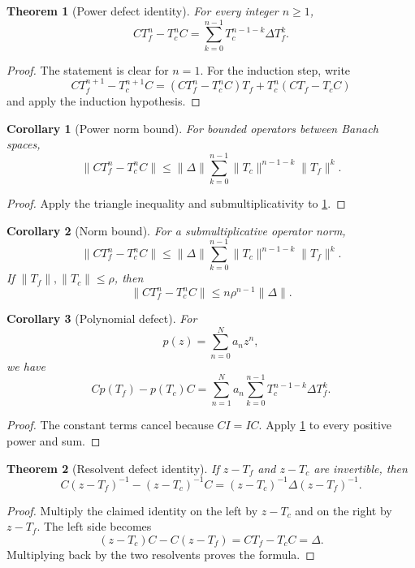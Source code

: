 \documentclass[11pt,a4paper]{article}
\newtheorem{theorem}{Theorem}[section]
\newtheorem{corollary}[corollary]{Corollary}
\theoremstyle{definition}
\theoremstyle{remark}
\theoremstyle{definition}\newtheorem{construction}[theorem]{Construction}\newtheorem{certificate}[theorem]{Numerical Certificate}
\theoremstyle{remark}\newtheorem{boundary}[theorem]{Boundary}
\begin{document}
\begin{theorem}[Power defect identity]\label{thm:power_defect}\label{thm:power-defect}
For every integer $n\geq1$,
\[
CT_f^n-T_c^nC
=
\sum_{k=0}^{n-1}T_c^{n-1-k}\Delta T_f^k.
\]
\end{theorem}

\begin{proof}
The statement is clear for $n=1$.  For the induction step, write
\[
CT_f^{n+1}-T_c^{n+1}C
=
(CT_f^n-T_c^nC)T_f+T_c^n(CT_f-T_cC)
\]
and apply the induction hypothesis.
\end{proof}

\begin{corollary}[Power norm bound]\label{cor:power_norm}
For bounded operators between Banach spaces,
\[
\|CT_f^n-T_c^nC\|
\leq
\|\Delta\|
\sum_{k=0}^{n-1}
\|T_c\|^{n-1-k}\|T_f\|^k.
\]
\end{corollary}

\begin{proof}
Apply the triangle inequality and submultiplicativity to \cref{thm:power_defect}.
\end{proof}

\begin{corollary}[Norm bound]\label{cor:defect-norm}
For a submultiplicative operator norm,
\[
\|CT_f^n-T_c^nC\|
\le
\|\Delta\|
\sum_{k=0}^{n-1}
\|T_c\|^{n-1-k}\|T_f\|^k.
\]
If $\|T_f\|,\|T_c\|\le\rho$, then
\[
\boxed{
\|CT_f^n-T_c^nC\|
\le n\rho^{n-1}\|\Delta\|.
}
\]
\end{corollary}

\begin{corollary}[Polynomial defect]\label{cor:polynomial_defect}
For
\[
p(z)=\sum_{n=0}^Na_nz^n,
\]
we have
\[
Cp(T_f)-p(T_c)C
=
\sum_{n=1}^Na_n
\sum_{k=0}^{n-1}T_c^{n-1-k}\Delta T_f^k.
\]
\end{corollary}

\begin{proof}
The constant terms cancel because $CI=IC$.  Apply \cref{thm:power_defect} to every positive power and sum.
\end{proof}

\begin{theorem}[Resolvent defect identity]\label{thm:resolvent_defect}\label{thm:resolvent-defect}
If $z-T_f$ and $z-T_c$ are invertible, then
\[
C(z-T_f)^{-1}-(z-T_c)^{-1}C
=
(z-T_c)^{-1}\Delta(z-T_f)^{-1}.
\]
\end{theorem}

\begin{proof}
Multiply the claimed identity on the left by $z-T_c$ and on the right by $z-T_f$.  The left side becomes
\[
(z-T_c)C-C(z-T_f)
=
CT_f-T_cC
=
\Delta.
\]
Multiplying back by the two resolvents proves the formula.
\end{proof}
\end{document}
